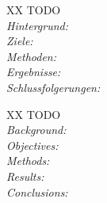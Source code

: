 \begin{abstractDE}
XX TODO \\
\textit{Hintergrund:} \\

\textit{Ziele:} \\

\textit{Methoden:} \\

\textit{Ergebnisse:} \\

\textit{Schlussfolgerungen:} \\

\end{abstractDE}

\vfill

\begin{abstractEN}
XX TODO \\

\textit{Background:} \\

\textit{Objectives:} \\

\textit{Methods:} \\

\textit{Results:} \\

\textit{Conclusions:} \\
\end{abstractEN}

\vfill
